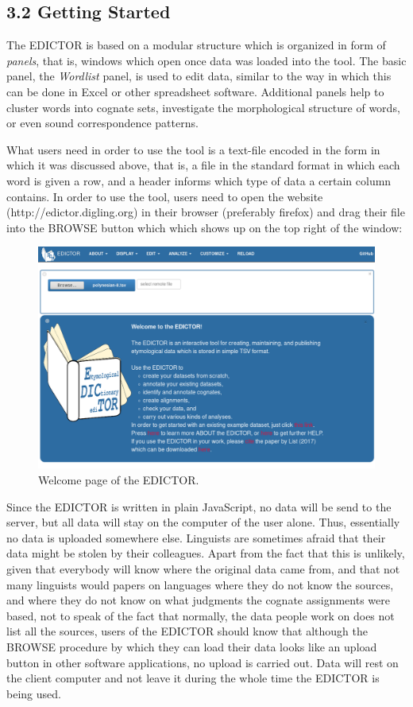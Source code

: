\documentclass[a4paper,svgnames]{scrartcl}
\begin{document}
\subsection*{3.2 Getting Started}\label{getting-started}

The EDICTOR is based on a modular structure which is organized in form
of \emph{panels}, that is, windows which open once data was loaded into
the tool. The basic panel, the \emph{Wordlist} panel, is used to edit
data, similar to the way in which this can be done in Excel or other
spreadsheet software. Additional panels help to cluster words into
cognate sets, investigate the morphological structure of words, or even
sound correspondence patterns.

What users need in order to use the tool is a text-file encoded in the
form in which it was discussed above, that is, a file in the standard
format in which each word is given a row, and a header informs which
type of data a certain column contains. In order to use the tool, users
need to open the website (http://edictor.digling.org) in their browser
(preferably firefox) and drag their file into the BROWSE button which
which shows up on the top right of the window:

\begin{figure}
\centering
\includegraphics{images/figure-1.png}
\caption{Welcome page of the EDICTOR.}
\end{figure}

Since the EDICTOR is written in plain JavaScript, no data will be send
to the server, but all data will stay on the computer of the user alone.
Thus, essentially no data is uploaded somewhere else. Linguists are
sometimes afraid that their data might be stolen by their colleagues.
Apart from the fact that this is unlikely, given that everybody will
know where the original data came from, and that not many linguists
would papers on languages where they do not know the sources, and where
they do not know on what judgments the cognate assignments were based,
not to speak of the fact that normally, the data people work on does not
list all the sources, users of the EDICTOR should know that although the
BROWSE procedure by which they can load their data looks like an upload
button in other software applications, no upload is carried out. Data
will rest on the client computer and not leave it during the whole time
the EDICTOR is being used.
\end{document}
